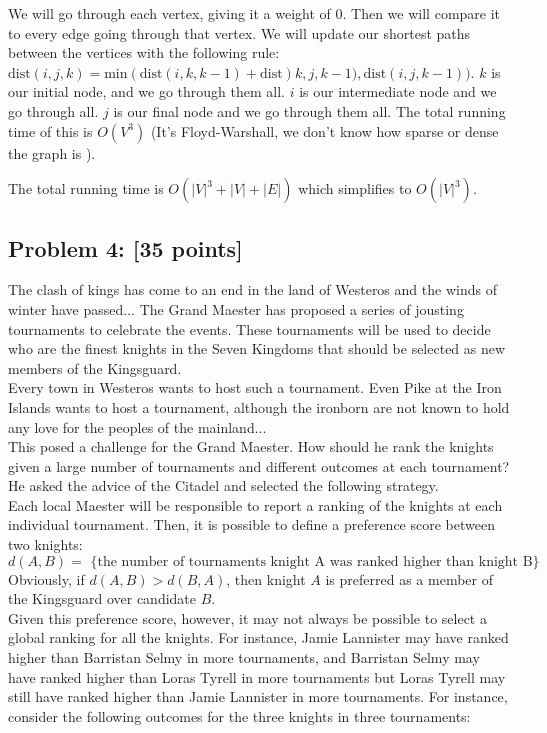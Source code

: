 \documentclass[11pt]{article}
\begin{document}
We will go through each vertex, giving it a weight of 0. Then we will compare it to every edge going through that vertex. We will update our shortest paths between the  vertices with the following rule: $\text{dist}(i,j,k) = \text{min}(\text{dist}(i,k,k-1)+\text{dist})k,j,k-1),\text{dist}(i,j,k-1))$. $k$ is our initial node, and we go through them all. $i$ is our intermediate node and we go through all. $j$ is our final node and we go through them all. The total running time of this is $O(V^3)$ (It's Floyd-Warshall, we don't know how sparse or dense the graph is ).

The total running time is $O(|V|^3 + |V| + |E|)$ which simplifies to $O(|V|^3)$.

\subsection*{Problem 4: [35 points]} The clash of kings has come to an end in
the land of Westeros and the winds of winter have passed... The Grand
Maester has proposed a series of jousting tournaments to celebrate the
events. These tournaments will be used to decide who are the finest
knights in the Seven Kingdoms that should be selected as new members
of the Kingsguard.\\

\noindent Every town in Westeros wants to host such a tournament. Even
Pike at the Iron Islands wants to host a tournament, although the
ironborn are not known to hold any love for the peoples of the
mainland...\\

\noindent This posed a challenge for the Grand Maester. How should he
rank the knights given a large number of tournaments and different
outcomes at each tournament? He asked the advice of the Citadel and
selected the following strategy.\\

\noindent Each local Maester will be responsible to report a ranking
of the knights at each individual tournament. Then, it is possible to
define a preference score between two knights:
$$d(A,B) = \textrm{ \{ the number of tournaments knight A was ranked
  higher than knight B\} }$$ Obviously, if $d(A,B) > d(B,A)$, then
knight $A$ is preferred as a member of the Kingsguard over candidate
$B$.\\

\noindent Given this preference score, however, it may not always be
possible to select a global ranking for all the knights. For instance,
Jamie Lannister may have ranked higher than Barristan Selmy in more
tournaments, and Barristan Selmy may have ranked higher than Loras
Tyrell in more tournaments but Loras Tyrell may still have ranked
higher than Jamie Lannister in more tournaments. For instance,
consider the following outcomes for the three knights in three
tournaments:
\end{document}
